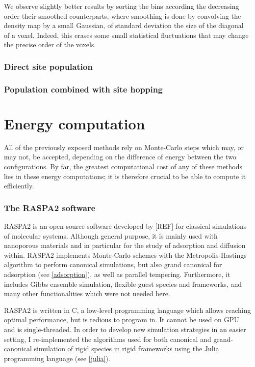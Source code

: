 \documentclass[main.tex]{subfiles}
\begin{document}
We observe slightly better results by sorting the bins according the decreasing order their smoothed counterparts, where smoothing is done by convolving the density map by a small Gaussian, of standard deviation the size of the diagonal of a voxel. Indeed, this erases some small statistical fluctuations that may change the precise order of the voxels.

\subsubsection{Direct site population}


\subsubsection{Population combined with site hopping}


\section{Energy computation}\label{energy_computation}

All of the previously exposed methods rely on Monte-Carlo steps which may, or may not, be accepted, depending on the difference of energy between the two configurations. By far, the greatest computational cost of any of these methods lies in these energy computations; it is therefore crucial to be able to compute it efficiently.

\subsubsection{The RASPA2 software}

RASPA2 is an open-source software developed by [REF] for classical simulations of molecular systems. Although general purpose, it is mainly used with nanoporous materials and in particular for the study of adsorption and diffusion within. RASPA2 implements Monte-Carlo schemes with the Metropolis-Hastings algorithm to perform canonical simulations, but also grand canonical for adsorption (see \cref{adsorption}), as well as parallel tempering. Furthermore, it includes Gibbs ensemble simulation, flexible guest species and frameworks, and many other functionalities which were not needed here.

RASPA2 is written in C, a low-level programming language which allows reaching optimal performance, but is tedious to program in. It cannot be used on GPU and is single-threaded. In order to develop new simulation strategies in an easier setting, I re-implemented the algorithms used for both canonical and grand-canonical simulation of rigid species in rigid frameworks using the Julia programming language (see \cref{julia}).
\end{document}
